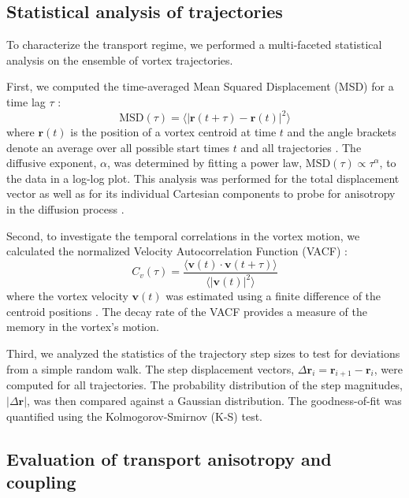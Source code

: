 \documentclass[]{article}
\begin{document}
\subsection{Statistical analysis of trajectories}

To characterize the transport regime, we performed a multi-faceted statistical analysis on the ensemble of vortex trajectories.

First, we computed the time-averaged Mean Squared Displacement (MSD) for a time lag $\tau$ \citep{bailey2022logitfitactive}:
\begin{equation}
\text{MSD}(\tau) = \langle |\mathbf{r}(t+\tau) - \mathbf{r}(t)|^2 \rangle
\end{equation}
where $\mathbf{r}(t)$ is the position of a vortex centroid at time $t$ and the angle brackets denote an average over all possible start times $t$ and all trajectories \citep{katayama2025notetwopointmeansquare}. The diffusive exponent, $\alpha$, was determined by fitting a power law, $\text{MSD}(\tau) \propto \tau^\alpha$, to the data in a log-log plot. This analysis was performed for the total displacement vector as well as for its individual Cartesian components to probe for anisotropy in the diffusion process \citep{mcclure2026collectivevortexdynamicsisolated}.

Second, to investigate the temporal correlations in the vortex motion, we calculated the normalized Velocity Autocorrelation Function (VACF) \citep{bradley2025velocitycorrelationsvorticesrarefaction}:
\begin{equation}
C_v(\tau) = \frac{\langle \mathbf{v}(t) \cdot \mathbf{v}(t+\tau) \rangle}{\langle |\mathbf{v}(t)|^2 \rangle}
\end{equation}
where the vortex velocity $\mathbf{v}(t)$ was estimated using a finite difference of the centroid positions \citep{ashraf2025experimentalinvestigationwaterexit}. The decay rate of the VACF provides a measure of the memory in the vortex's motion.

Third, we analyzed the statistics of the trajectory step sizes to test for deviations from a simple random walk. The step displacement vectors, $\Delta \mathbf{r}_i = \mathbf{r}_{i+1} - \mathbf{r}_i$, were computed for all trajectories. The probability distribution of the step magnitudes, $|\Delta \mathbf{r}|$, was then compared against a Gaussian distribution. The goodness-of-fit was quantified using the Kolmogorov-Smirnov (K-S) test.

\subsection{Evaluation of transport anisotropy and coupling}
\end{document}
